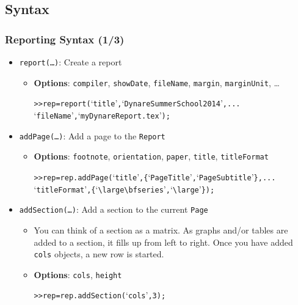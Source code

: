 \documentclass[10pt]{beamer}
\newcommand{\myitem}{\item[$\bullet$]}
\begin{document}
\subsection{Syntax}
\begin{frame}[fragile,t]
  \frametitle{Reporting Syntax (1/3)}
  \begin{itemize}
  \myitem \texttt{report(\ldots)}: Create a report
    \begin{itemize}
    \myitem \textbf{Options}: \texttt{compiler}, \texttt{showDate}, \texttt{fileName}, \texttt{margin}, \texttt{marginUnit}, \ldots
    \begin{alltt}
>> rep = report(`title', `Dynare Summer School 2014', ...
                `fileName', `myDynareReport.tex');
    \end{alltt}
    \end{itemize}
  \myitem \texttt{addPage(\ldots)}: Add a page to the \texttt{Report}
    \begin{itemize}
    \myitem \textbf{Options}: \texttt{footnote}, \texttt{orientation}, \texttt{paper}, \texttt{title}, \texttt{titleFormat}
    \begin{alltt}
>> rep = rep.addPage(`title', \{`Page Title', `Page Subtitle'\}, ...
                     `titleFormat', \{`\textbackslash{}large\textbackslash{}bfseries', `\textbackslash{}large'\});
    \end{alltt}
    \end{itemize}
  \myitem \texttt{addSection(\ldots)}: Add a section to the current \texttt{Page}
    \begin{itemize}
    \myitem You can think of a section as a matrix. As graphs and/or tables are added to a section, it fills up from left to right. Once you have added \texttt{cols} objects, a new row is started.
    \myitem \textbf{Options}: \texttt{cols}, \texttt{height}
    \begin{alltt}
>> rep = rep.addSection(`cols', 3);
    \end{alltt}
    \end{itemize}
  \end{itemize}
\end{frame}
\end{document}
